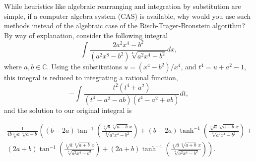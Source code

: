 \documentclass[12pt]{article}
\numberwithin{equation}{section}
\theoremstyle{definition}
\begin{document}
While heuristics like algebraic rearranging and integration by substitution are simple, if a 
computer algebra system (CAS) is available, why would you use such methods instead of the 
algebraic case of the Risch-Trager-Bronstein algorithm? By way of explanation, consider 
the following integral 
\begin{equation*}
\int\frac{2 a^2 x^4-b^2}{\left(a^2 x^8-b^2\right)\sqrt[4]{a^2 x^4-b^2}}dx,
\end{equation*}
where $a,b\in\mathbb{C}$. Using the substitutions $u=\left(x^4-b^2\right)/x^4$, and 
$t^4=u+a^2-1$, this integral is reduced to integrating a rational function, 
\begin{equation*}
-\int\frac{t^2 \left(t^4+a^2\right)}{\left(t^4-a^2-a b\right) \left(t^4-a^2+a b\right)}dt,
\end{equation*}
and the solution to our original integral is 
\iffalse
\begin{multline*}
\frac{b-2 a}{4 \sqrt[4]{a} b \sqrt[4]{a-b}} \tan ^{-1}\left(\frac{\sqrt[4]{a}\sqrt[4]{a-b}\,x}{\sqrt[4]{a^2x^4-b^2}}\right) + 
\frac{b-2 a}{4 \sqrt[4]{a} b\sqrt[4]{a-b}} \tanh ^{-1}\left(\frac{\sqrt[4]{a}\sqrt[4]{a-b}\,x}{\sqrt[4]{a^2 x^4-b^2}}\right) +\\ 
\frac{2 a+b}{\sqrt[4]{a} b \sqrt[4]{a+b}} \tan^{-1}\left(\frac{\sqrt[4]{a}\sqrt[4]{a+b}\,x}{\sqrt[4]{a^2 x^4-b^2}}\right) + 
\frac{2 a+b}{4 \sqrt[4]{a} b \sqrt[4]{a+b}} \tanh ^{-1}\left(\frac{\sqrt[4]{a}\sqrt[4]{a+b}\,x}{\sqrt[4]{a^2 x^4-b^2}}\right).
\end{multline*}
\fi
\iffalse
\begin{multline*}
\frac{b-2 a}{4 \sqrt[4]{a} b \sqrt[4]{a-b}} \left( \tan ^{-1}\left(\frac{\sqrt[4]{a}\sqrt[4]{a-b}\,x}{\sqrt[4]{a^2x^4-b^2}}\right) + 
\tanh ^{-1}\left(\frac{\sqrt[4]{a}\sqrt[4]{a-b}\,x}{\sqrt[4]{a^2 x^4-b^2}}\right)\right) +\\ 
\frac{2 a+b}{\sqrt[4]{a} b \sqrt[4]{a+b}} \left( \tan^{-1}\left(\frac{\sqrt[4]{a}\sqrt[4]{a+b}\,x}{\sqrt[4]{a^2 x^4-b^2}}\right) + 
\tanh ^{-1}\left(\frac{\sqrt[4]{a}\sqrt[4]{a+b}\,x}{\sqrt[4]{a^2 x^4-b^2}}\right)\right).
\end{multline*}
\fi
\begin{multline*}
\frac{1}{4b \sqrt[4]{a} \sqrt[4]{a-b}} \left( 
\left(b-2a\right)\tan ^{-1}\left(\frac{\sqrt[4]{a}\sqrt[4]{a-b}\,x}{\sqrt[4]{a^2x^4-b^2}}\right) + 
\left(b-2a\right)\tanh ^{-1}\left(\frac{\sqrt[4]{a}\sqrt[4]{a-b}\,x}{\sqrt[4]{a^2 x^4-b^2}}\right)\right. +\\ 
\left. \left(2a+b\right)\tan^{-1}\left(\frac{\sqrt[4]{a}\sqrt[4]{a+b}\,x}{\sqrt[4]{a^2 x^4-b^2}}\right) + 
\left(2a+b\right) \tanh ^{-1}\left(\frac{\sqrt[4]{a}\sqrt[4]{a+b}\,x}{\sqrt[4]{a^2 x^4-b^2}}\right)
\right).
\end{multline*}
\end{document}
